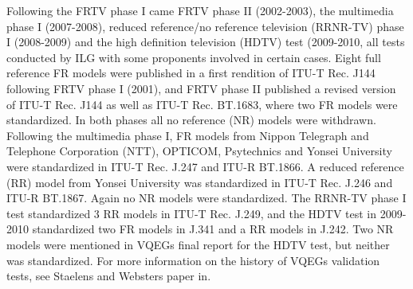 Following the FRTV phase I came FRTV phase II (2002-2003), the multimedia phase I (2007-2008), reduced reference/no reference television (RRNR-TV) phase I (2008-2009) and the high definition television (HDTV) test (2009-2010, all tests conducted by ILG with some proponents involved in certain cases. Eight full reference FR models were published in a first rendition of ITU-T Rec. J144 following FRTV phase I (2001), and FRTV phase II published a revised version of ITU-T Rec. J144 as well as ITU-T Rec. BT.1683, where two FR models were standardized. In both phases all no reference (NR) models were withdrawn. Following the multimedia phase I, FR models from Nippon Telegraph and Telephone Corporation (NTT), OPTICOM, Psytechnics and Yonsei University were standardized in ITU-T Rec. J.247 and ITU-R BT.1866. A reduced reference (RR) model from Yonsei University was standardized in ITU-T Rec. J.246 and ITU-R BT.1867. Again no NR models were standardized. The RRNR-TV phase I test standardized 3 RR models in ITU-T Rec. J.249, and the HDTV test in 2009-2010 standardized two FR models in J.341 and a RR models in J.242. Two NR models were mentioned in VQEGs final report for the HDTV test, but neither was standardized. For more information on the history of VQEGs validation tests, see Staelens and Websters paper in\cite{6659332}.

\begin{table}
	\begin{tablebox}[adjusted title= Overview of test phases, width=\linewidth]
    \end{tablebox}
    \caption{Overview of test phases}
	\label{table:testOverview}
\end{table}


